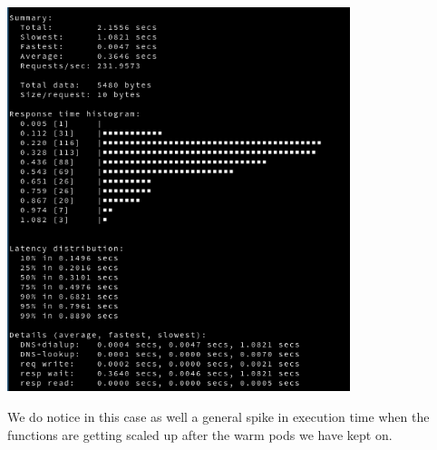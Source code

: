 \documentclass[12pt,titlepage]{article}
\begin{document}
\begin{center}
   \begin{minipage}{\linewidth}
     \centering
     \includegraphics[width=100mm]{./thesis_images/fizz-buzz-minio-2.png}
     \label{fig:fizz-buzz-minio-2}
   \end{minipage}
\end{center}

We do notice in this case as well a general spike in execution time when the
functions are getting scaled up after the warm pods we have kept on.
\end{document}
